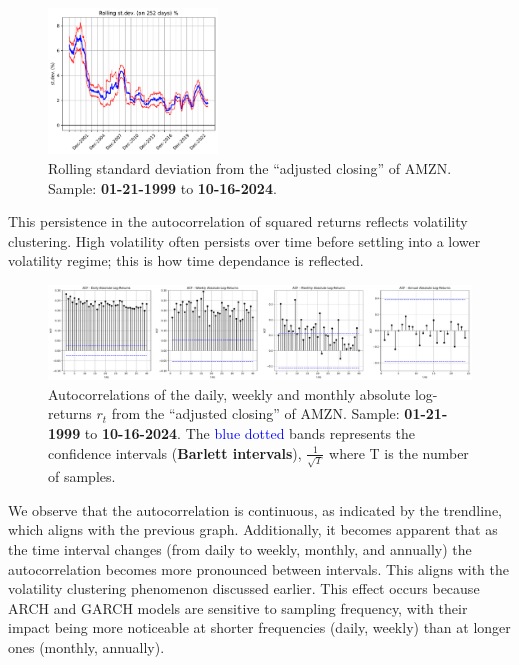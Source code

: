 \documentclass{article}
\begin{document}
\begin{figure}[H]
    \centering
    \includegraphics[width=0.4\textwidth]{Img/Fact7_AMZN_rolling_stdev.pdf}
    \caption{Rolling standard deviation from the “adjusted closing” of AMZN. Sample: \textbf{01-21-1999} to \textbf{10-16-2024}.}
    \label{fig:Rolling_std_dev_1}
\end{figure}

\noindent This persistence in the autocorrelation of squared returns reflects volatility clustering. 
High volatility often persists over time before settling into a lower volatility regime; 
this is how time dependance is reflected.



\begin{figure}[H]
    \centering
    \includegraphics[width=1\textwidth]{Img/Fact7_AbsoluteLogReturns.pdf}
    \caption{Autocorrelations of the daily, weekly and monthly absolute log-returns $r_t$ from the “adjusted closing” of AMZN. Sample: \textbf{01-21-1999} to \textbf{10-16-2024}.
    The \textcolor{blue}{blue dotted} bands represents the confidence intervals (\textbf{Barlett intervals}), $\frac{1}{\sqrt{T}}$ where T is the number of samples.}
    \label{fig:atocorrelation_abs_logreturns}
\end{figure}

\noindent We observe that the autocorrelation is continuous, as indicated by the trendline, 
which aligns with the previous graph. 
Additionally, it becomes apparent that as the time interval changes (from daily to weekly, monthly, and annually) 
the autocorrelation becomes more pronounced between intervals. 
This aligns with the volatility clustering phenomenon discussed earlier. 
This effect occurs because ARCH and GARCH models are sensitive to sampling frequency, 
with their impact being more noticeable at shorter frequencies (daily, weekly) than at longer ones (monthly, annually).
\end{document}

